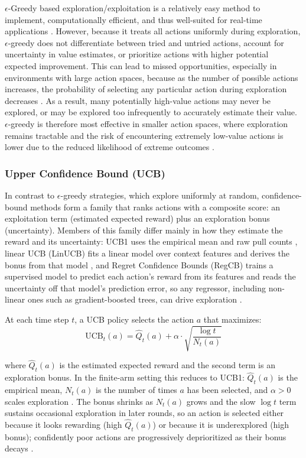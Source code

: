 \documentclass[manuscript,review,screen]{acmart}
\begin{document}
 $\epsilon$-Greedy based exploration/exploitation is a relatively easy method to implement, computationally efficient, and thus well-suited for real-time applications \cite{Sutton1998}. However, because it treats all actions uniformly during exploration, $\epsilon$-greedy does not differentiate between tried and untried actions, account for uncertainty in value estimates, or prioritize actions with higher potential expected improvement. This can lead to missed opportunities, especially in environments with large action spaces, because as the number of possible actions increases, the probability of selecting any particular action during exploration decreases \cite{bubeck2012regret}. As a result, many potentially high-value actions may never be explored, or may be explored too infrequently to accurately estimate their value. $\epsilon$-greedy is therefore most effective in smaller action spaces, where exploration remains tractable and the risk of encountering extremely low-value actions is lower due to the reduced likelihood of extreme outcomes \cite{dulac2021challenges}. \\
    
\subsubsection{\textbf{Upper Confidence Bound (UCB)}} In contrast to $\epsilon$-greedy strategies, which explore uniformly at random, confidence-bound methods form a family that ranks actions with a composite score: an exploitation term (estimated expected reward) plus an exploration bonus (uncertainty). Members of this family differ mainly in how they estimate the reward and its uncertainty: UCB1 uses the empirical mean and raw pull counts \cite{auer2002finite}, linear UCB (LinUCB) fits a linear model over context features and derives the bonus from that model \cite{li2010contextual}, and Regret Confidence Bounds (RegCB) trains a supervised model to predict each action's reward from its features and reads the uncertainty off that model's prediction error, so any regressor, including non-linear ones such as gradient-boosted trees, can drive exploration \cite{foster2018contextual}.

At each time step $t$, a UCB policy selects the action $a$ that maximizes:
\begin{equation}
    \text{UCB}_t(a) = \hat{Q}_t(a) + \alpha \cdot \sqrt{\frac{\log t}{N_t(a)}}
    \label{eq:ucb}
\end{equation}

where $\hat{Q}_t(a)$ is the estimated expected reward and the second term is an exploration bonus. In the finite-arm setting this reduces to UCB1: $\hat{Q}_t(a)$ is the empirical mean, $N_t(a)$ is the number of times $a$ has been selected, and $\alpha > 0$ scales exploration \cite{auer2002finite, bubeck2012regret}. The bonus shrinks as $N_t(a)$ grows and the slow $\log t$ term sustains occasional exploration in later rounds, so an action is selected either because it looks rewarding (high $\hat{Q}_t(a)$) or because it is underexplored (high bonus); confidently poor actions are progressively deprioritized as their bonus decays \cite{auer2002finite}. 
\end{document}

